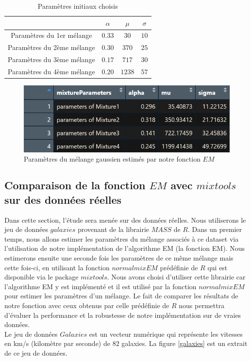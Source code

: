\documentclass[a4paper,french,10pt]{article}
\begin{document}
\begin{table}[htp]
	\center
	\begin{tabular}{|c||c|c|c|}
		\hline
		& $\alpha$ & $\mu$ & $\sigma$\\
		\hline
		Paramètres du 1er mélange & $0.33$ & $30$ & $10$ \\
		\hline
		Paramètres du 2ème mélange & $0.30$ & $370$ & $25$ \\
		\hline
		Paramètres du 3ème mélange & $0.17$ & $717$ & $30$ \\
		\hline
		Paramètres du 4ème mélange & $0.20$ & $1238$ & $57$ \\
		\hline
	\end{tabular}
	\caption{Paramètres initiaux choisis}
	\label{tab4}
\end{table}

\begin{figure}[htp] 
	\centering
	\includegraphics[scale=0.8]{images/res_sim2.png}
	\caption{Paramètres du mélange gaussien estimés par notre fonction $EM$}
	\label{res_sim2}
\end{figure}




\subsection{Comparaison de la fonction $EM$ avec $mixtools$ sur des données réelles}
Dans cette section, l'étude sera menée sur des données réelles. Nous utiliserons le jeu de données $galaxies$ provenant de la librairie $MASS$ de $R$. Dans un premier temps, nous allons estimer les paramètres du mélange associés à ce dataset via l'utilisation de notre implémentation de l'algorithme EM (la fonction EM). Nous estimerons ensuite une seconde fois les paramètres de ce même mélange mais cette fois-ci, en utilisant la fonction $normalmixEM$ prédéfinie de $R$ qui est disponible via le package $mixtools$. Nous avons choisi d'utiliser cette librairie car l'algorithme EM y est implémenté et il est utilisé par la fonction $normalmixEM$ pour estimer les paramètres d'un mélange. Le fait de comparer les résultats de notre fonction avec ceux obtenus par celle prédéfinie de $R$ nous permettra d'évaluer la performance et la robustesse de notre implémentation sur de vraies données.\\
Le jeu de données $Galaxies$ est un vecteur numérique qui représente les vitesses en km/s (kilomètre par seconde) de $82$ galaxies. La figure \ref{galaxies} est un extrait de ce jeu de données.
\end{document}
